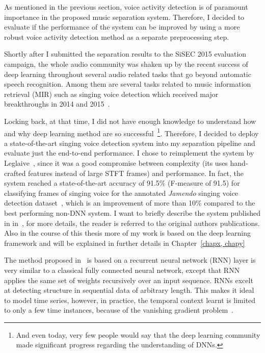As mentioned in the previous section, voice activity detection is of paramount importance in the proposed music separation system.
Therefore, I decided to evaluate if the performance of the system can be improved by using a more robust voice activity detection method as a separate preprocessing step.
\par
Shortly after I submitted the separation results to the SiSEC 2015 evaluation campaign, the whole audio community was shaken up by the recent success of deep learning throughout several audio related tasks that go beyond automatic speech recognition.
Among them are several tasks related to music information retrieval (MIR) such as singing voice detection which received major breakthroughs in 2014 and 2015~\cite{Lehner14, Lehner15, Leglaive15, schlueter15}.
\par
Locking back, at that time, I did not have enough knowledge to understand how and why deep learning method are so successful~\footnote{And even today, very few people would say that the deep learning community made significant progress regarding the understanding of DNNs.}.
Therefore, I decided to deploy a state-of-the-art singing voice detection system into my separation pipeline and evaluate just the end-to-end performance.
I chose to reimplement the system by Leglaive~\cite{Leglaive15}, since it was a good compromise between complexity (its uses hand-crafted features instead of large STFT frames) and performance.
In fact, the system reached a state-of-the-art accuracy of 91.5\% (F-measure of 91.5) for classifying frames of singing voice for the annotated \emph{Jamendo} singing voice detection dataset~\cite{ramona08}, which is an improvement of more than 10\% compared to the best performing non-DNN system.
I want to briefly describe the system published in in~\cite{Leglaive15}, for more details, the reader is referred to the original authors publications.
Also in the course of this thesis more of my work is based on the deep learning framework and will be explained in further details in Chapter~\ref{chapx, chapy}
\par
The method proposed in~\cite{Leglaive15} is based on a recurrent neural network (RNN) layer is very similar to a classical fully connected neural network, except that RNN applies the same set of weights recursively over an input sequence.
RNNs excelt at detecting structure in sequential data of arbitrary length.
This makes it ideal to model time series, however, in practice, the temporal context learnt is limited to only a few time instances, because of the vanishing gradient problem~\cite{Hochreiter98}.

